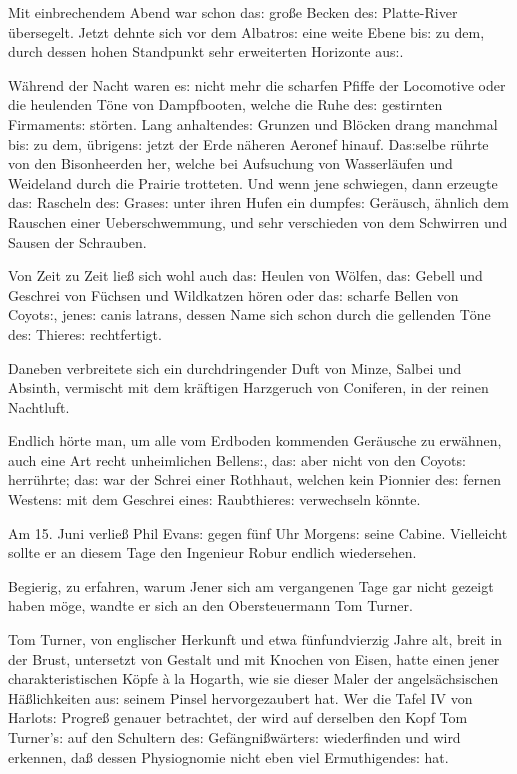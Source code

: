\documentclass[oneside,12pt]{book}
\newenvironment{antiqua}{\normalfont}{}
\newcommand{\s}{s:}
\begin{document}
Mit einbrechendem Abend war schon da{\s} gro{\ss}e Becken de{\s}
Platte-River \"ubersegelt. Jetzt dehnte sich vor dem
{\glqq}Albatro{\s}{\grqq} eine weite Ebene bi{\s} zu dem, durch
dessen hohen Standpunkt sehr erweiterten Horizonte au{\s}.

W\"ahrend der Nacht waren e{\s} nicht mehr die scharfen Pfiffe der
Locomotive oder die heulenden T\"one von Dampfbooten, welche die Ruhe
de{\s} gestirnten Firmament{\s} st\"orten. Lang anhaltende{\s}
Grunzen und Bl\"ocken drang manchmal bi{\s} zu dem, \"ubrigen{\s}
jetzt der Erde n\"aheren Aeronef hinauf. Da{\s}selbe r\"uhrte von den
Bisonheerden her, welche bei Aufsuchung von Wasserl\"aufen und
Weideland durch die Prairie trotteten. Und wenn jene schwiegen, dann
erzeugte da{\s} Rascheln de{\s} Grase{\s} unter ihren Hufen ein
dumpfe{\s} Ger\"ausch, \"ahnlich dem Rauschen einer Ueberschwemmung,
und sehr verschieden von dem Schwirren und Sausen der Schrauben.

Von Zeit zu Zeit lie{\ss} sich wohl auch da{\s} Heulen von W\"olfen,
da{\s} Gebell und Geschrei von F\"uchsen und Wildkatzen h\"oren oder
da{\s} scharfe Bellen von Coyot{\s}, jene{\s} \begin{antiqua}canis
latrans\end{antiqua}, dessen Name sich schon durch die gellenden
T\"one de{\s} Thiere{\s} rechtfertigt.

Daneben verbreitete sich ein durchdringender Duft von Minze, Salbei
und Absinth, vermischt mit dem kr\"aftigen Harzgeruch von Coniferen,
in der reinen Nachtluft.

Endlich h\"orte man, um alle vom Erdboden kommenden Ger\"ausche zu
erw\"ahnen, auch eine Art recht unheimlichen Bellen{\s}, da{\s} aber
nicht von den Coyot{\s} herr\"uhrte; da{\s} war der Schrei einer
Rothhaut, welchen kein Pionnier de{\s} fernen Westen{\s} mit dem
Geschrei eine{\s} Raubthiere{\s} verwechseln k\"onnte.

Am 15. Juni verlie{\ss} Phil Evan{\s} gegen f\"unf Uhr Morgen{\s}
seine Cabine. Vielleicht sollte er an diesem Tage den Ingenieur Robur
endlich wiedersehen.

Begierig, zu erfahren, warum Jener sich am vergangenen Tage gar nicht
gezeigt haben m\"oge, wandte er sich an den Obersteuermann Tom
Turner.

Tom Turner, von englischer Herkunft und etwa f\"unfundvierzig Jahre
alt, breit in der Brust, untersetzt von Gestalt und mit Knochen von
Eisen, hatte einen jener charakteristischen K\"opfe \begin{antiqua}\`a
la\end{antiqua} Hogarth, wie sie dieser Maler der angels\"achsischen
H\"a{\ss}lichkeiten au{\s} seinem Pinsel hervorgezaubert hat. Wer die
Tafel \begin{antiqua}IV\end{antiqua} von Harlot{\s} Progre{\ss}
genauer betrachtet, der wird auf derselben den Kopf Tom Turner'{\s}
auf den Schultern de{\s} Gef\"angni{\ss}w\"arter{\s} wiederfinden
und wird erkennen, da{\ss} dessen Physiognomie nicht eben viel
Ermuthigende{\s} hat.
\end{document}
